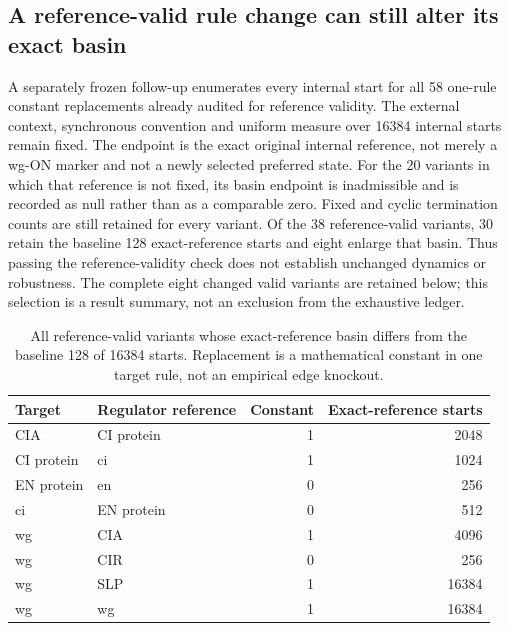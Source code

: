 \subsection{A reference-valid rule change can still alter its exact basin}
A separately frozen follow-up enumerates every internal start for all 58 one-rule constant replacements already audited for reference validity. The external context, synchronous convention and uniform measure over 16384 internal starts remain fixed. The endpoint is the exact original internal reference, not merely a wg-ON marker and not a newly selected preferred state. For the 20 variants in which that reference is not fixed, its basin endpoint is inadmissible and is recorded as null rather than as a comparable zero. Fixed and cyclic termination counts are still retained for every variant.
Of the 38 reference-valid variants, 30 retain the baseline 128 exact-reference starts and eight enlarge that basin. Thus passing the reference-validity check does not establish unchanged dynamics or robustness. The complete eight changed valid variants are retained below; this selection is a result summary, not an exclusion from the exhaustive ledger.
\begin{table}[ht]\centering
\caption{All reference-valid variants whose exact-reference basin differs from the baseline 128 of 16384 starts. Replacement is a mathematical constant in one target rule, not an empirical edge knockout.}
\begin{tabular}{llrr}\hline
Target & Regulator reference & Constant & Exact-reference starts\\\hline
CIA & CI protein & 1 & 2048\\
CI protein & ci & 1 & 1024\\
EN protein & en & 0 & 256\\
ci & EN protein & 0 & 512\\
wg & CIA & 1 & 4096\\
wg & CIR & 0 & 256\\
wg & SLP & 1 & 16384\\
wg & wg & 1 & 16384\\\hline
\end{tabular}\end{table}



